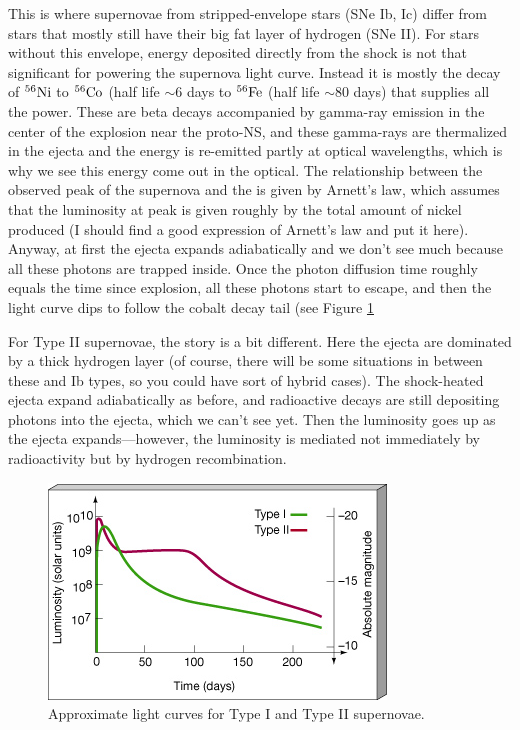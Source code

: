 This is where supernovae from stripped-envelope stars (SNe Ib, Ic) differ from stars that mostly still have their big fat layer of hydrogen (SNe II). For stars without this envelope, energy deposited directly from the shock is not that significant for powering the supernova light curve. Instead it is mostly the decay of $^{56}{\rm Ni}$ to $^{56}{\rm Co}$ (half life $\sim 6$ days to $^{56}{\rm Fe}$ (half life $\sim 80$ days) that supplies all the power. These are beta decays accompanied by gamma-ray emission in the center of the explosion near the proto-NS, and these gamma-rays are thermalized in the ejecta and the energy is re-emitted partly at optical wavelengths, which is why we see this energy come out in the optical. The relationship between the observed peak of the supernova and the is given by Arnett's law, which assumes that the luminosity at peak is given roughly by the total amount of nickel produced (I should find a good expression of Arnett's law and put it here). Anyway, at first the ejecta expands adiabatically and we don't see much because all these photons are trapped inside. Once the photon diffusion time roughly equals the time since explosion, all these photons start to escape, and then the light curve dips to follow the cobalt decay tail (see Figure \ref{f:sn_lc}

For Type II supernovae, the story is a bit different. Here the ejecta are dominated by a thick hydrogen layer (of course, there will be some situations in between these and Ib types, so you could have sort of hybrid cases). The shock-heated ejecta expand adiabatically as before, and radioactive decays are still depositing photons into the ejecta, which we can't see yet. Then the luminosity goes up as the ejecta expands---however, the luminosity is mediated not immediately by radioactivity but by hydrogen recombination.

\begin{figure}[!h]
\begin{center}
\includegraphics[width=\textwidth]{sn_lc.jpg}
\caption{Approximate light curves for Type I and Type II supernovae. \label{f:sn_lc}}
\end{center}
\end{figure}

